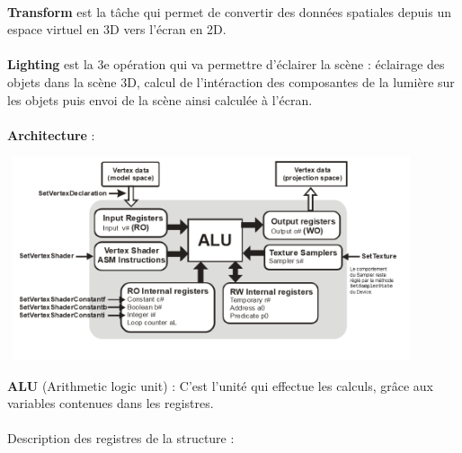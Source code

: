 \textbf{\\Transform} est la tâche qui permet de convertir des données spatiales depuis un espace virtuel en 3D vers l'écran en 2D.
\\\\
\textbf{Lighting} est la 3e opération qui va permettre d'éclairer la scène : éclairage des objets dans la scène 3D, calcul de l'intéraction des composantes de la lumière sur les objets puis envoi de la scène ainsi calculée à l'écran.
\\\\
\textbf{Architecture} :
\\
\begin{center}
\includegraphics[width=12cm,height=60mm]{pipeline/images/ArchiVertex.png}
\end{center}

\textbf{ALU} (Arithmetic logic unit) : C’est l’unité qui effectue les calculs, grâce aux variables contenues dans les registres.
\\\\
Description des registres de la structure :

